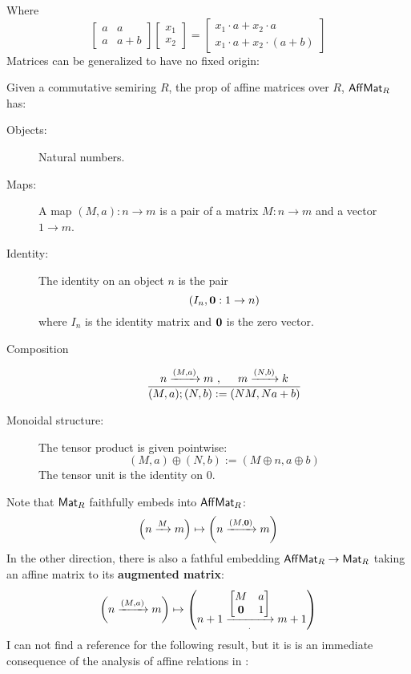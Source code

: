 Where
$$
\begin{bmatrix}
a & a\\
a & a+b
\end{bmatrix}
\begin{bmatrix}
x_1\\
x_2
\end{bmatrix}
=
\begin{bmatrix}
x_1 \cdot a+x_2\cdot a\\
x_1\cdot a+x_2\cdot (a+b)
\end{bmatrix}
$$
Matrices can be generalized to have no fixed origin:
\begin{definition}
Given a commutative semiring $R$, the prop of affine matrices over $R$, $\mathsf{Aff}\mathsf{Mat}_R$ has:
\begin{description}
\item[Objects:] Natural numbers.
\item[Maps:] A map $(M,a):n\to m$ is a pair of a matrix $M:n\to m$ and a vector $1\to m$.
\item[Identity:] The identity on an object $n$ is the pair
$$(I_n,{\bf 0}:1\to n)$$
 where $I_n$ is the identity matrix and $\bf 0$ is the zero vector.
\item[Composition]
$$
\dfrac{
n \xrightarrow{(M,a)} m\ , \hspace*{.5cm} m \xrightarrow {(N,b)} k
}{
(M,a);(N,b):=(NM, Na+b)
}
$$
\item[Monoidal structure:]  The tensor product is given pointwise:
 $$(M,a)\oplus (N,b):=(M\oplus n, a\oplus b)$$ 
The tensor unit is the identity on $0$.
\end{description}
\end{definition}
Note that  $\mathsf{Mat}_R$ faithfully embeds into $\mathsf{Aff}\mathsf{Mat}_R$:
$$
\left(n \xrightarrow{M} m\right)
\mapsto 
\left(n \xrightarrow{(M,{\bf 0})} m\right)
$$
In the other direction, there is also a fathful embedding $\mathsf{Aff}\mathsf{Mat}_R\to \mathsf{Mat}_R$ taking an affine matrix to its {\bf augmented matrix}:
$$
\left(n\xrightarrow{(M,a)} m\right)
\mapsto
\left(
\vcenter{\hbox{$\displaystyle{
n+1
\xrightarrow[ . ]{
\begin{bmatrix}
M & a\\
\mathbf{0} & 1
\end{bmatrix}}
m+1}$}}
\right)
$$
I can not find a reference for the following result, but it is is an immediate consequence of the analysis of affine relations in \cite{affine}:
